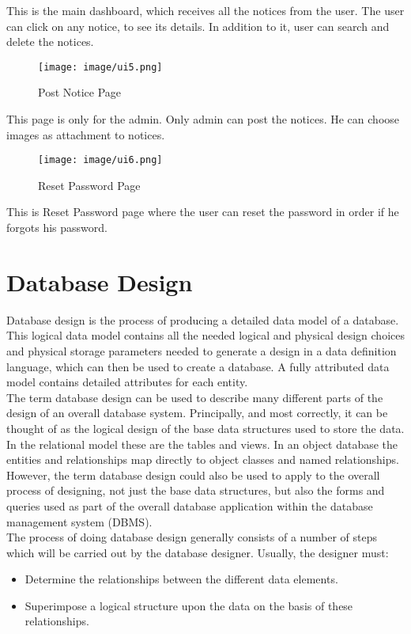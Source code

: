 This is the main dashboard, which receives all the notices from the user. The user can click on any notice, to see its details.
In addition to it, user can search and delete the notices.

\begin{figure}[H]
\centering \texttt{[image: image/ui5.png]}
\caption{Post Notice Page}
\end{figure}

This page is only for the admin. Only admin can post the notices. He can choose images as attachment to notices.

\begin{figure}[H]
\centering \texttt{[image: image/ui6.png]}
\caption{Reset Password Page}
\end{figure}

This is Reset Password page where the user can reset the password in order if he forgots his password.

\pagebreak
\section{Database Design}
Database design is the process of producing a detailed data model of a database. This logical data model contains all the needed logical and physical design choices and physical storage parameters needed to generate a design in a data definition language, which can then be used to create a database. A fully attributed data model contains detailed attributes for each entity.\\

The term database design can be used to describe many different parts of the design of an overall database system. Principally, and most correctly, it can be thought of as the logical design of the base data structures used to store the data. In the relational model these are the tables and views. In an object database the entities and relationships map directly to object classes and named relationships. However, the term database design could also be used to apply to the overall process of designing, not just the base data structures, but also the forms and queries used as part of the overall database application within the database management system (DBMS).\\

The process of doing database design generally consists of a number of steps which will be carried out by the database designer. Usually, the designer must:
\begin{itemize}
\item Determine the relationships between the different data elements.
\item Superimpose a logical structure upon the data on the basis of these relationships.
\end{itemize}



